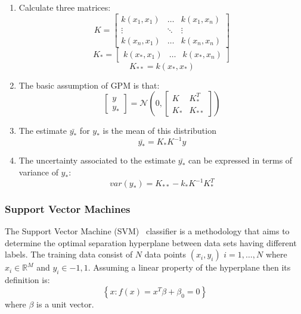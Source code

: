 \begin{enumerate}
\item Calculate three matrices:
\begin{equation}
K=\begin{bmatrix}
k(x_1,x_1) &  \ldots & k(x_1,x_n)\\ 
\vdots  & \ddots &\vdots  \\ 
k(x_n,x_1) &  \ldots & k(x_n,x_n)
\end{bmatrix}
\end{equation}
\begin{equation}
K_*= \begin{bmatrix}
k(x_*,x_1) & \ldots & k(x_*,x_n)
\end{bmatrix}
\end{equation}
\begin{equation}
K_{**}=k(x_*,x_*)
\end{equation}
\item The basic assumption of GPM is that:
\begin{equation}
\begin{bmatrix}
y\\
y_* 
\end{bmatrix}
=\mathcal{N}(0,\begin{bmatrix}
K & K_{*}^{T}\\ 
K_* & K_{**}
\end{bmatrix})
\end{equation}
\item The estimate $\bar{y_*} $ for $y_*$ is the mean of this distribution
\begin{equation}
\bar{y_*}=K_* K^{-1}y
\end{equation}
\item The uncertainty associated to the estimate $\bar{y_*} $ can be expressed in terms of variance of  $y_*$:
\begin{equation}
var(y_*)=K_{**}-k_* K^{-1} K_{*}^{T}
\end{equation}
\end{enumerate}

\subsubsection{Support Vector Machines}
\label{sec:SVM}
The Support Vector Machine (SVM)~\cite{SVM_Burges} classifier is a methodology that aims to determine the optimal separation hyperplane between data sets having different labels.
The training data consist of $N$ data points $(x_i,y_i)$ $i=1,\ldots,N$ where $x_i \in \mathbb{R}^M$ and $y_i \in {-1,1}$.
Assuming a linear property of the hyperplane  then its definition is:
\begin{equation}
\left \{ x: f(x)=x^T\beta+\beta_0=0 \right \}
\end{equation}
where $\beta$ is a unit vector. 

